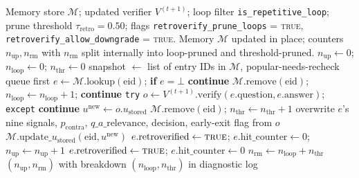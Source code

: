\begin{algorithm}
\caption{Stage~8 retroactive re-verification (runs once per cycle boundary after successful fine-tuning).}
\label{alg:retroverify}
\begin{algorithmic}[1]
\Require Memory store $\mathcal{M}$; updated verifier $V^{(t+1)}$; loop filter \texttt{is\_repetitive\_loop}; prune threshold $\tau_{\text{retro}} = 0.50$; flags \texttt{retroverify\_prune\_loops} = \textsc{true}, \texttt{retroverify\_allow\_downgrade} = \textsc{true}.
\Ensure Memory $\mathcal{M}$ updated in place; counters $n_{\text{up}}, n_{\text{rm}}$ with $n_{\text{rm}}$ split internally into loop-pruned and threshold-pruned.
\State $n_{\text{up}} \gets 0$; $n_{\text{loop}} \gets 0$; $n_{\text{thr}} \gets 0$
\State snapshot $\gets$ list of entry IDs in $\mathcal{M}$, popular-needs-recheck queue first 
    \State $e \gets \mathcal{M}.\text{lookup}(\text{eid})$; \textbf{if} $e = \bot$ \textbf{continue}
        \State $\mathcal{M}.\text{remove}(\text{eid})$; $n_{\text{loop}} \gets n_{\text{loop}} + 1$; \textbf{continue} 
    \EndIf
    \State \texttt{try} $o \gets V^{(t+1)}.\text{verify}(e.\text{question}, e.\text{answer})$; \texttt{except} \textbf{continue}
    \State $u^{\text{new}} \gets o.u_{\text{stored}}$
        \State $\mathcal{M}.\text{remove}(\text{eid})$; $n_{\text{thr}} \gets n_{\text{thr}} + 1$
        \State overwrite $e$'s nine signals, $p_{\text{contra}}$, $q\_a\_\text{relevance}$, decision, early-exit flag from $o$
        \State $\mathcal{M}.\text{update}\_u_{\text{stored}}(\text{eid}, u^{\text{new}})$
        \State $e.\text{retroverified} \gets \textsc{true}$; $e.\text{hit\_counter} \gets 0$; $n_{\text{up}} \gets n_{\text{up}} + 1$
    \Else
        \State $e.\text{retroverified} \gets \textsc{true}$; $e.\text{hit\_counter} \gets 0$ 
    \EndIf
\EndFor
\State $n_{\text{rm}} \gets n_{\text{loop}} + n_{\text{thr}}$
\State \Return $(n_{\text{up}}, n_{\text{rm}})$ with breakdown $(n_{\text{loop}}, n_{\text{thr}})$ in diagnostic log
\end{algorithmic}
\end{algorithm}

